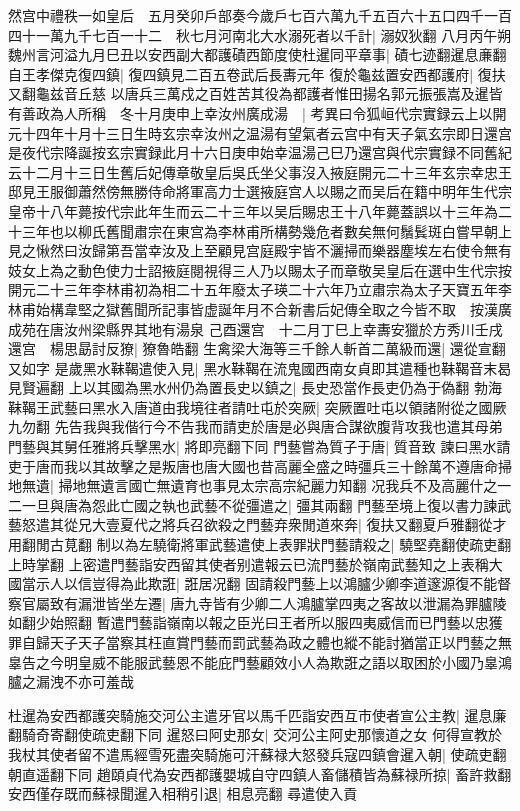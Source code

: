 然宫中禮秩一如皇后　五月癸卯戶部奏今歲戶七百六萬九千五百六十五口四千一百四十一萬九千七百一十二　秋七月河南北大水溺死者以千計|{
	溺奴狄翻}
八月丙午朔魏州言河溢九月巳丑以安西副大都護磧西節度使杜暹同平章事|{
	磧七迹翻暹息亷翻}
自王孝傑克復四鎮|{
	復四鎮見二百五卷武后長夀元年}
復於龜兹置安西都護府|{
	復扶又翻龜兹音丘慈}
以唐兵三萬戍之百姓苦其役為都護者惟田揚名郭元振張嵩及暹皆有善政為人所稱　冬十月庚申上幸汝州廣成湯　|{
	考異曰令狐峘代宗實録云上以開元十四年十月十三日生時玄宗幸汝州之温湯有望氣者云宫中有天子氣玄宗即日還宫是夜代宗降誕按玄宗實録此月十六日庚申始幸温湯己巳乃還宫與代宗實録不同舊紀云十二月十三日生舊后妃傳章敬皇后吳氏坐父事沒入掖庭開元二十三年玄宗幸忠王邸見王服御蕭然傍無勝侍命將軍高力士選掖庭宫人以賜之而吴后在籍中明年生代宗皇帝十八年薨按代宗此年生而云二十三年以吴后賜忠王十八年薨蓋誤以十三年為二十三年也以柳氏舊聞肅宗在東宫為李林甫所構勢幾危者數矣無何鬚鬂斑白嘗早朝上見之愀然曰汝歸第吾當幸汝及上至顧見宫庭殿宇皆不灑掃而樂器塵埃左右使令無有妓女上為之動色使力士詔掖庭閱視得三人乃以賜太子而章敬吴皇后在選中生代宗按開元二十三年李林甫初為相二十五年廢太子瑛二十六年乃立肅宗為太子天寶五年李林甫始構韋堅之獄舊聞所記事皆虚誕年月不合新書后妃傳全取之今皆不取　按漢廣成苑在唐汝州梁縣界其地有湯泉}
己酉還宫　十二月丁巳上幸夀安獵於方秀川壬戌還宫　楊思勗討反獠|{
	獠魯皓翻}
生禽梁大海等三千餘人斬首二萬級而還|{
	還從宣翻又如字}
是歲黑水靺鞨遣使入見|{
	黑水靺鞨在流鬼國西南女貞即其遣種也靺鞨音末曷見賢遍翻}
上以其國為黑水州仍為置長史以鎮之|{
	長史恐當作長吏仍為于偽翻}
勃海靺鞨王武藝曰黑水入唐道由我境往者請吐屯於突厥|{
	突厥置吐屯以領諸附從之國厥九勿翻}
先告我與我偕行今不告我而請吏於唐是必與唐合謀欲腹背攻我也遣其母弟門藝與其舅任雅將兵擊黑水|{
	將即亮翻下同}
門藝嘗為質子于唐|{
	質音致}
諫曰黑水請吏于唐而我以其故擊之是叛唐也唐大國也昔高麗全盛之時彊兵三十餘萬不遵唐命掃地無遺|{
	掃地無遺言國亡無遺育也事見太宗高宗紀麗力知翻}
况我兵不及高麗什之一二一旦與唐為怨此亡國之執也武藝不從彊遣之|{
	彊其兩翻}
門藝至境上復以書力諫武藝怒遣其從兄大壹夏代之將兵召欲殺之門藝弃衆閒道來奔|{
	復扶又翻夏戶雅翻從才用翻閒古莧翻}
制以為左驍衛將軍武藝遣使上表罪狀門藝請殺之|{
	驍堅堯翻使疏吏翻上時掌翻}
上密遣門藝詣安西留其使者别遣報云已流門藝於嶺南武藝知之上表稱大國當示人以信豈得為此欺誑|{
	誑居况翻}
固請殺門藝上以鴻臚少卿李道邃源復不能督察官屬致有漏泄皆坐左遷|{
	唐九寺皆有少卿二人鴻臚掌四夷之客故以泄漏為罪臚陵如翻少始照翻}
暫遣門藝詣嶺南以報之臣光曰王者所以服四夷威信而已門藝以忠獲罪自歸天子天子當察其枉直賞門藝而罰武藝為政之體也縱不能討猶當正以門藝之無辠告之今明皇威不能服武藝恩不能庇門藝顧效小人為欺誑之語以取困於小國乃辠鴻臚之漏洩不亦可羞哉

杜暹為安西都護突騎施交河公主遣牙官以馬千匹詣安西互市使者宣公主教|{
	暹息廉翻騎奇寄翻使疏吏翻下同}
暹怒曰阿史那女|{
	交河公主阿史那懷道之女}
何得宣教於我杖其使者留不遣馬經雪死盡突騎施可汗蘇禄大怒發兵寇四鎮會暹入朝|{
	使疏吏翻朝直遥翻下同}
趙頤貞代為安西都護嬰城自守四鎮人畜儲積皆為蘇禄所掠|{
	畜許救翻}
安西僅存既而蘇禄聞暹入相稍引退|{
	相息亮翻}
尋遣使入貢

